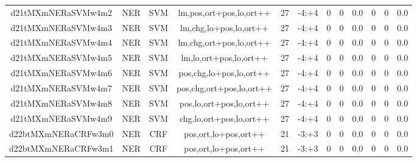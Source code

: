 \documentclass[a4paper]{article}
\begin{document}
\begin{landscape}
\begin{center}
\begin{tabular}{ |c|c|c|c|c|c|c|c|c|c|c|c|}
 
 	
 	\small{ d21tMXmNERaSVMw4m2 } & \small{ NER} & \small{  SVM }  & lm,pos,ort+pos,lo,ort++  &  27 &  \small{  -4:+4 }  &  0 & 0 & 0.0  &  0 & 0 & 0.0 \\
 	

 
 	
 	\small{ d21tMXmNERaSVMw4m3 } & \small{ NER} & \small{  SVM }  & lm,chg,lo+pos,lo,ort++  &  27 &  \small{  -4:+4 }  &  0 & 0 & 0.0  &  0 & 0 & 0.0 \\
 	

 
 	
 	\small{ d21tMXmNERaSVMw4m4 } & \small{ NER} & \small{  SVM }  & lm,chg,ort+pos,lo,ort++  &  27 &  \small{  -4:+4 }  &  0 & 0 & 0.0  &  0 & 0 & 0.0 \\
 	

 
 	
 	\small{ d21tMXmNERaSVMw4m5 } & \small{ NER} & \small{  SVM }  & lm,lo,ort+pos,lo,ort++  &  27 &  \small{  -4:+4 }  &  0 & 0 & 0.0  &  0 & 0 & 0.0 \\
 	

 
 	
 	\small{ d21tMXmNERaSVMw4m6 } & \small{ NER} & \small{  SVM }  & pos,chg,lo+pos,lo,ort++  &  27 &  \small{  -4:+4 }  &  0 & 0 & 0.0  &  0 & 0 & 0.0 \\
 	

 
 	
 	\small{ d21tMXmNERaSVMw4m7 } & \small{ NER} & \small{  SVM }  & pos,chg,ort+pos,lo,ort++  &  27 &  \small{  -4:+4 }  &  0 & 0 & 0.0  &  0 & 0 & 0.0 \\
 	

 
 	
 	\small{ d21tMXmNERaSVMw4m8 } & \small{ NER} & \small{  SVM }  & pos,lo,ort+pos,lo,ort++  &  27 &  \small{  -4:+4 }  &  0 & 0 & 0.0  &  0 & 0 & 0.0 \\
 	

 
 	
 	\small{ d21tMXmNERaSVMw4m9 } & \small{ NER} & \small{  SVM }  & chg,lo,ort+pos,lo,ort++  &  27 &  \small{  -4:+4 }  &  0 & 0 & 0.0  &  0 & 0 & 0.0 \\
 	

 
 	
 	\small{ d22btMXmNERaCRFw3m0 } & \small{ NER} & \small{  CRF }  & pos,ort,lo+pos,ort++  &  21 &  \small{  -3:+3 }  &  0 & 0 & 0.0  &  0 & 0 & 0.0 \\
 	

 
 	
 	\small{ d22btMXmNERaCRFw3m1 } & \small{ NER} & \small{  CRF }  & pos,ort,lo+pos,ort++  &  21 &  \small{  -3:+3 }  &  0 & 0 & 0.0  &  0 & 0 & 0.0 \\
 	


\end{tabular}
\end{center}
\end{landscape}
\end{document}
